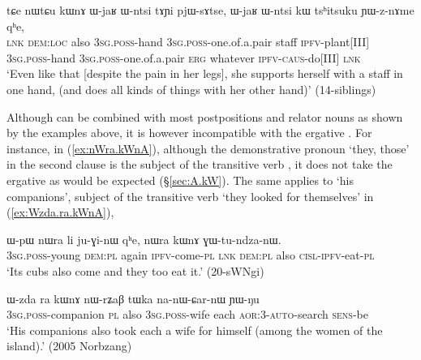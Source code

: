     \begin{exe}
\ex \label{ex:nWtCu.kWnA2}
\gll    tɕe nɯtɕu kɯnɤ ɯ-jaʁ ɯ-ntsi tɤɲi pjɯ-sɤtse, ɯ-jaʁ ɯ-ntsi kɯ tsʰitsuku ɲɯ-z-nɤme qʰe, \\
\textsc{lnk} \textsc{dem}:\textsc{loc} also \textsc{3sg}.\textsc{poss}-hand \textsc{3sg}.\textsc{poss}-one.of.a.pair staff \textsc{ipfv}-plant[III]  \textsc{3sg}.\textsc{poss}-hand \textsc{3sg}.\textsc{poss}-one.of.a.pair \textsc{erg} whatever \textsc{ipfv}-\textsc{caus}-do[III] \textsc{lnk}  \\
\glt `Even like that [despite the pain in her legs], she supports herself with a staff in one hand, (and does all kinds of things with her other hand)' (14-siblings) 
\end{exe}

Although  can be combined with most postpositions and relator nouns as shown by the examples above, it is however incompatible with the ergative . For instance, in  (\ref{ex:nWra.kWnA}), although the demonstrative pronoun  `they, those' in the second clause is the subject of the transitive verb , it does not take the ergative  as would be expected (§\ref{sec:A.kW}). The same applies to  `his companions', subject of the transitive verb  `they looked for themselves' in (\ref{ex:Wzda.ra.kWnA}), 

  \begin{exe}
\ex \label{ex:nWra.kWnA}
\gll ɯ-pɯ nɯra li ju-ɣi-nɯ qʰe, nɯra kɯnɤ ɣɯ-tu-ndza-nɯ. \\
\textsc{3sg}.\textsc{poss}-young \textsc{dem}:\textsc{pl} again \textsc{ipfv}-come-\textsc{pl} \textsc{lnk} \textsc{dem}:\textsc{pl} also \textsc{cisl}-\textsc{ipfv}-eat-\textsc{pl} \\
\glt `Its cubs also come and they too eat it.' (20-sWNgi) 
\end{exe}
  
\begin{exe}
\ex \label{ex:Wzda.ra.kWnA}
\gll   ɯ-zda ra kɯnɤ nɯ-rʑaβ tɯka na-nɯ-ɕar-nɯ ɲɯ-ŋu \\
\textsc{3sg}.\textsc{poss}-companion \textsc{pl} also \textsc{3sg}.\textsc{poss}-wife each \textsc{aor}:3\flobv{}-\textsc{auto}-search \textsc{sens}-be \\
\glt `His companions also took each a wife for himself (among the women of the island).' (2005 Norbzang)
    \end{exe}
    
